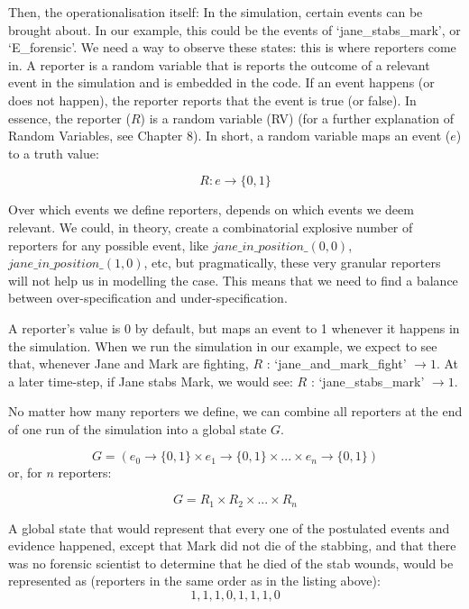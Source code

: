 \begin{example}
\begin{description}
\end{description}

\end{example}




Then, the operationalisation itself: In the simulation, certain events can be brought about. In our example, this could be the events of `jane\_stabs\_mark', or `E\_forensic'.  We need a way to observe these states: this is where reporters come in. A reporter is a random variable that is reports the outcome of a relevant event in the simulation and is embedded in the code. If an event happens (or does not happen), the reporter reports that the event is true (or false). In essence, the reporter ($R$) is a random variable (RV) (for a further explanation of Random Variables, see Chapter 8). In short, a random variable maps an event ($e$) to a truth value:

\[ R : e \rightarrow \{0, 1\} \]

Over which events we define reporters, depends on which events we deem relevant. We could, in theory, create a combinatorial explosive number of reporters for any possible event, like $jane\_in\_position\_(0, 0)$, $jane\_in\_position\_(1, 0)$, etc, but pragmatically, these very granular reporters will not help us in modelling the case. This means that we need to find a balance between over-specification and under-specification.

A reporter's value is 0 by default, but maps an event to 1 whenever it happens in the simulation. When we run the simulation in our example, we expect to see that, whenever Jane and Mark are fighting, $R$ : `jane\_and\_mark\_fight' $\rightarrow 1$. At a later time-step, if Jane stabs Mark, we would see: $R$ : `jane\_stabs\_mark' $\rightarrow 1$.

No matter how many reporters we define, we can combine all reporters at the end of one run of the simulation into a global state $G$.

\[ G = (e_0 \rightarrow \{0, 1\} \times e_1 \rightarrow \{0, 1\} \times ... \times e_n \rightarrow \{0, 1\})\]
 or, for $n$ reporters:
 
\[ G = R_1 \times R_2 \times... \times R_n\]


A global state that would represent that every one of the postulated events and evidence happened, except that Mark did not die of the stabbing, and that there was no forensic scientist to determine that he died of the stab wounds, would be represented as (reporters in the same order as in the listing above):
 \[1,1,1,0,1,1,1,0\]


